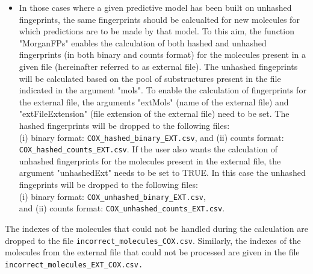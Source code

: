 \documentclass[twoside,a4wide,12pt]{article}\usepackage[]{graphicx}\usepackage[]{color}
\begin{document}
\begin{itemize}
\item In those cases where a given predictive model has been built on unhashed fingeprints, the same fingerprints should be 
calcualted for new molecules for which predictions are to be made by that model. 
To this aim, the function "MorganFPs" enables the calculation of both hashed and unhashed fingerprints (in both binary and counts format) for the molecules present in a given file (hereinafter referred to as external file). The unhashed fingeprints will be calculated based on the pool of substructures present in the file indicated in the argument "mols".
To enable the calculation of fingerprints for the external file, the arguments "extMols" (name of the external file) and "extFileExtension" (file extension of the external file) need to be set. 
The hashed fingerprints will be dropped to the following files:\\
(i) binary format: \verb|COX_hashed_binary_EXT.csv|, and (ii) counts format: 
\verb|COX_hashed_counts_EXT.csv|.
If the user also wants the calculation of unhashed fingerprints for the molecules present in the external file, the argument "unhashedExt" needs to be set to TRUE. 
In this case the unhashed fingeprints will be dropped to the following files:\\
(i) binary format: \verb|COX_unhashed_binary_EXT.csv|,\\
and (ii) counts format: \verb|COX_unhashed_counts_EXT.csv|.

\end{itemize}

The indexes of the molecules that could not be handled during the calculation are dropped to the file \verb|incorrect_molecules_COX.csv|. Similarly, the indexes of the molecules from the external file that could not be processed are given in the file \verb|incorrect_molecules_EXT_COX.csv.|
\end{document}
